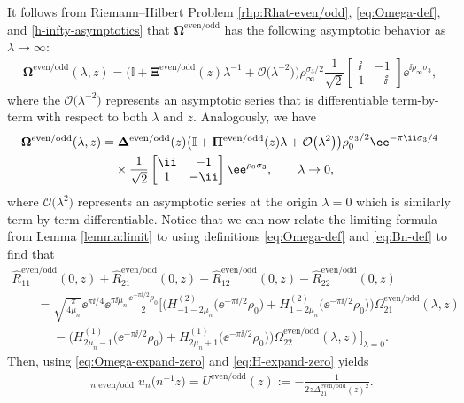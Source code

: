 It follows from Riemann--Hilbert Problem \ref{rhp:Rhat-even/odd}, \eqref{eq:Omega-def}, and \eqref{h-infty-asymptotics} that $\mathbf{\Omega}^\mathrm{even/odd}$ has the following asymptotic behavior as $\lambda \to \infty$:
\begin{align}
\mathbf{\Omega}^\mathrm{even/odd}(\lambda, z) = \big( \mathbb{I} + \mathbf{\Xi^{\mathrm{even/odd}}}(z) \lambda^{-1} + \mathcal{O}\big(\lambda^{-2}\big) \big) \rho_\infty^{\sigma_3/2} {\dfrac{1}{\sqrt{2}}} \begin{bmatrix} \ii & -1\\ 1 &-\ii \end{bmatrix} \ee^{\ii \rho_\infty \sigma_3},
 \label{eq:Omega-expand-infty}
\end{align}
where the $\mathcal{O}\big(\lambda^{-2}\big)$ represents an asymptotic series that is differentiable term-by-term with respect to both $\lambda$ and $z$. Analogously, we have
\begin{align}
 &\mathbf{\Omega}^{\mathrm{even/odd}}(\lambda,z)= \mathbf{\Delta}^\mathrm{even/odd}(z)\big(\mathbb{I}+\mathbf{\Pi}^\mathrm{even/odd}(z)\lambda+\mathcal{O}\big(\lambda^2\big)\big)\rho_0^{\sigma_3/2}\ee^{-\pi \ii \sigma_3/4} \nonumber\\
 &\hphantom{\mathbf{\Omega}^{\mathrm{even/odd}}(\lambda,z)=}{}
 \times{\dfrac{1}{\sqrt{2}}} {}{} \begin{bmatrix} \ii & -1 \\ 1 &-\ii \end{bmatrix} \ee^{ \rho_0 \sigma_3}, \qquad \lambda\to 0,
 \label{eq:Omega-expand-zero}
\end{align}
where $\mathcal{O}\big(\lambda^2\big)$ represents an asymptotic series at the origin $\lambda=0$ which is similarly term-by-term differentiable.
Notice that we can now relate the limiting formula from Lemma \ref{lemma:limit} to  using definitions \eqref{eq:Omega-def} and \eqref{eq:Bn-def} to find that
\begin{gather*}
 \hat{R}^\mathrm{even/odd}_{11}(0,z)+\hat{R}^\mathrm{even/odd}_{21}(0,z)-\hat{R}^\mathrm{even/odd}_{12}(0,z)-\hat{R}^\mathrm{even/odd}_{22}(0,z)\\
 \qquad =\sqrt{\frac{\pi}{4\mu_n}} \ee^{\pi \ii/4} \ee^{\pi \ii \mu_n} \frac{\ee^{-\pi \ii/2}\rho_0}{2} \big[ \big(H^{(2)}_{-1-2\mu_n}\big(\ee^{-\pi \ii/2}\rho_0\big) + H^{(2)}_{1-2\mu_n}\big(\ee^{-\pi \ii/2}\rho_0\big)\big)\Omega^{\mathrm{even/odd}}_{21}(\lambda, z) \\
 \phantom{\qquad =}{}- \big(H^{(1)}_{2\mu_n-1}\big(\ee^{-\pi \ii/2}\rho_0\big) + H^{(1)}_{2\mu_n +1}\big(\ee^{-\pi \ii/2}\rho_0\big)\big)\Omega^{\mathrm{even/odd}}_{22}(\lambda, z) \big]_{\lambda=0}.
\end{gather*}
Then, using \eqref{eq:Omega-expand-zero} and \eqref{eq:H-expand-zero} yields
\begin{gather*}
 \mathop{\lim_{n\to\infty}}_{\text{$n$ even/odd}}u_n\big(n^{-1}z\big)=U^\mathrm{even/odd}(z):=-\frac{1}{2z\Delta^\mathrm{even/odd}_{21}(z)^2}.
\end{gather*}

